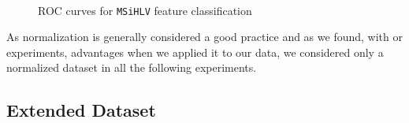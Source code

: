 \begin{figure}[!htb]
  \centering
    \\
    \hspace{1mm}
    \caption{ROC curves for \texttt{MSiHLV} feature classification}
    \label{ch6:fig2}
\end{figure}


As normalization is generally considered a good practice and as we found, with or experiments, advantages when we applied it to our data, we considered 
only a normalized dataset in all the following experiments.

\vspace{0.5cm}


\subsection{Extended Dataset}

